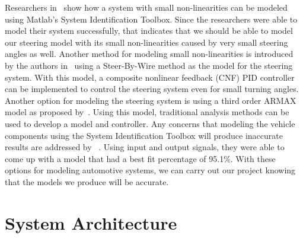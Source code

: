 \documentclass[12pt]{article} %
\begin{document}
Researchers in~\cite{Adnan2010} show how a system with small non-linearities can
be modeled using Matlab's System Identification Toolbox. Since the researchers
were able to model their system successfully, that indicates that we should be
able to model our steering model with its small non-linearities caused by very
small steering angles as well. Another method for modeling small non-linearities
is introduced by the authors in~\cite{Saruchi2015} using a Steer-By-Wire method
as the model for the steering system. With this model, a composite nonlinear
feedback (CNF) PID controller can be implemented to control the steering system
even for small turning angles. Another option for modeling the steering system
is using a third order ARMAX model as proposed by~\cite{Li1999}. Using this
model, traditional analysis methods can be used to develop a model and
controller. Any concerns that modeling the vehicle components using the System
Identification Toolbox will produce inaccurate results are addressed by
~\cite{Donjaroennon2021}. Using input and output signals, they were able to come
up with a model that had a best fit percentage of 95.1\%. With these options for
modeling automotive systems, we can carry out our project knowing that the
models we produce will be accurate.

\section{System Architecture}
\end{document}
